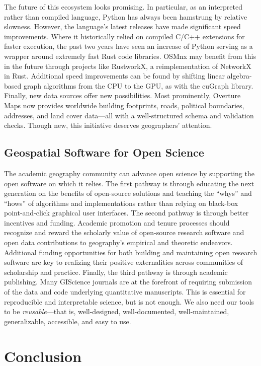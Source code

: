 \documentclass[12pt,letterpaper]{article} %
\begin{document}
The future of this ecosystem looks promising. In particular, as an interpreted rather than compiled language, Python has always been hamstrung by relative slowness. However, the language's latest releases have made significant speed improvements. Where it historically relied on compiled C/C++ extensions for faster execution, the past two years have seen an increase of Python serving as a wrapper around extremely fast Rust code libraries. OSMnx may benefit from this in the future through projects like RustworkX, a reimplementation of NetworkX in Rust. Additional speed improvements can be found by shifting linear algebra-based graph algorithms from the CPU to the GPU, as with the cuGraph library. Finally, new data sources offer new possibilities. Most prominently, Overture Maps now provides worldwide building footprints, roads, political boundaries, addresses, and land cover data---all with a well-structured schema and validation checks. Though new, this initiative deserves geographers' attention.

\subsection{Geospatial Software for Open Science}

The academic geography community can advance open science by supporting the open software on which it relies. The first pathway is through educating the next generation on the benefits of open-source solutions and teaching the \enquote{whys} and \enquote{hows} of algorithms and implementations rather than relying on black-box point-and-click graphical user interfaces. The second pathway is through better incentives and funding. Academic promotion and tenure processes should recognize and reward the scholarly value of open-source research software and open data contributions to geography's empirical and theoretic endeavors. Additional funding opportunities for both building and maintaining open research software are key to realizing their positive externalities across communities of scholarship and practice. Finally, the third pathway is through academic publishing. Many GIScience journals are at the forefront of requiring submission of the data and code underlying quantitative manuscripts. This is essential for reproducible and interpretable science, but is not enough. We also need our tools to be \textit{reusable}---that is, well-designed, well-documented, well-maintained, generalizable, accessible, and easy to use.

\section{Conclusion}
\end{document}
